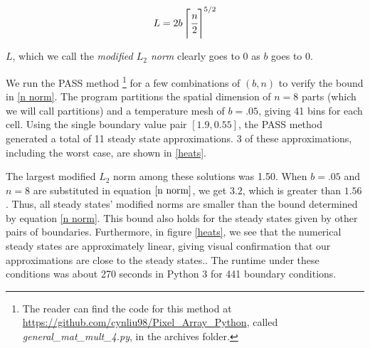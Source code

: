 \documentclass[11pt]{article}
\begin{document}
\begin{equation}
\label{n norm}
L = 2b \left \lceil \cfrac{n}{2} \right \rceil^{5/2}
\end{equation}

$L$, which we call the \emph{modified $L_2$ norm} clearly goes to 0 as $b$ goes to 0. 

We run the PASS method%
\footnote{The reader can find the code for this method at \url{https://github.com/cynliu98/Pixel\_Array\_Python}, called \textit{general\_mat\_mult\_4.py}, in the archives folder.}
for a few combinations of $(b,n)$ to verify the bound in \eqref{n norm}. The program partitions the spatial dimension of $n=8$ parts (which we will call partitions) and a temperature mesh of $b = .05$, giving 41 bins for each cell. Using the single boundary value pair $[1.9,0.55]$, the PASS method generated a total of 11 steady state approximations. 3 of these approximations, including the worst case, are shown in \cref{heats}.

The largest modified $L_2$ norm among these solutions was 1.50. When $b = .05$ and $n = 8$ are substituted in equation $\cref{n norm}$, we get $3.2$, which is greater than $1.56$. Thus, all steady states' modified norms are smaller than the bound determined by equation \cref{n norm}. This bound also holds for the steady states given by other pairs of boundaries. Furthermore, in figure \cref{heats}, we see that the numerical steady states are approximately linear, giving visual confirmation that our approximations are close to the steady states.. The runtime under these conditions was about 270 seconds in Python 3 for 441 boundary conditions. 


\begin{figure*}
\begin{center}
\caption{The numerical steady state approximations given for homogeneous heat equation with the boundaries [1.9,.55]}
\label{heats}
\end{center}
\end{figure*}
\end{document}
